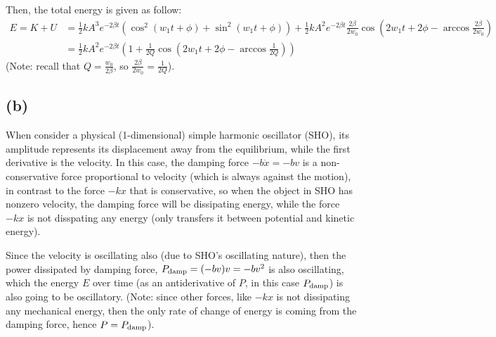 \documentclass{article}
\begin{document}
Then, the total energy is given as follow:
\begin{align}
    E = K+U &= \frac{1}{2}kA^3e^{-2\beta t}(\cos^2(w_1t+\phi)+\sin^2(w_1t+\phi)) + \frac{1}{2}kA^2e^{-2\beta t}\frac{2\beta}{2w_0}\cos\left(2w_1t+2\phi-\arccos\frac{2\beta}{2w_0}\right)\\
    &= \frac{1}{2}kA^2e^{-2\beta t}\left(1+\frac{1}{2Q}\cos\left(2w_1t+2\phi-\arccos\frac{1}{2Q}\right)\right)
\end{align}
(Note: recall that $Q=\frac{w_0}{2\beta}$, so $\frac{2\beta}{2w_0} = \frac{1}{2Q}$).

\subsection*{(b)}
When consider a physical (1-dimensional) simple harmonic oscillator (SHO), its amplitude represents its displacement away from the equilibrium, while the first derivative is the velocity. In this case, the damping force $-b\dot x = -bv$ is a non-conservative force proportional to velocity (which is always against the motion), in contrast to the force $-kx$ that is conservative, so when the object in SHO has nonzero velocity, the damping force will be dissipating energy, while the force $-kx$ is not disspating any energy (only transfers it between potential and kinetic energy).

Since the velocity is oscillating also (due to SHO's oscillating nature), then the power dissipated by damping force, $P_\textmd{damp} = (-bv)v = -bv^2$ is also oscillating, which the energy $E$ over time (as an antiderivative of $P$, in this case $P_\textmd{damp}$) is also going to be oscillatory. 
(Note: since other forces, like $-kx$ is not dissipating any mechanical energy, then the only rate of change of energy is coming from the damping force, hence $P=P_\textmd{damp}$).
\end{document}
